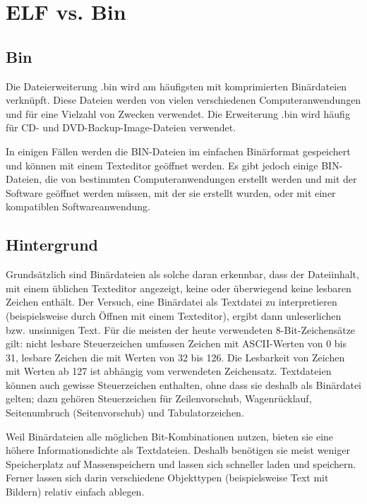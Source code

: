 \section{ELF vs. Bin}

\subsection{Bin}
Die Dateierweiterung .bin wird am häufigsten mit komprimierten Binärdateien verknüpft. Diese Dateien werden von vielen verschiedenen Computeranwendungen und für eine Vielzahl von Zwecken verwendet. Die Erweiterung .bin wird häufig für CD- und DVD-Backup-Image-Dateien verwendet.

In einigen Fällen werden die BIN-Dateien im einfachen Binärformat gespeichert und können mit einem Texteditor geöffnet werden. Es gibt jedoch einige BIN-Dateien, die von bestimmten Computeranwendungen erstellt werden und mit der Software geöffnet werden müssen, mit der sie erstellt wurden, oder mit einer kompatiblen Softwareanwendung.\cite{file.org_bin}

\subsection{Hintergrund}
Grundsätzlich sind Binärdateien als solche daran erkennbar, dass der Dateiinhalt, mit einem üblichen Texteditor angezeigt, keine oder überwiegend keine lesbaren Zeichen enthält. Der Versuch, eine Binärdatei als Textdatei zu interpretieren (beispielsweise durch Öffnen mit einem Texteditor), ergibt dann unleserlichen bzw. unsinnigen Text. Für die meisten der heute verwendeten 8-Bit-Zeichensätze gilt: nicht lesbare Steuerzeichen umfassen Zeichen mit ASCII-Werten von 0 bis 31, lesbare Zeichen die mit Werten von 32 bis 126. Die Lesbarkeit von Zeichen mit Werten ab 127 ist abhängig vom verwendeten Zeichensatz. Textdateien können auch gewisse Steuerzeichen enthalten, ohne dass sie deshalb als Binärdatei gelten; dazu gehören Steuerzeichen für Zeilenvorschub, Wagenrücklauf, Seitenumbruch (Seitenvorschub) und Tabulatorzeichen.

Weil Binärdateien alle möglichen Bit-Kombinationen nutzen, bieten sie eine höhere Informationsdichte als Textdateien. Deshalb benötigen sie meist weniger Speicherplatz auf Massenspeichern und lassen sich schneller laden und speichern. Ferner lassen sich darin verschiedene Objekttypen (beispielsweise Text mit Bildern) relativ einfach ablegen.

